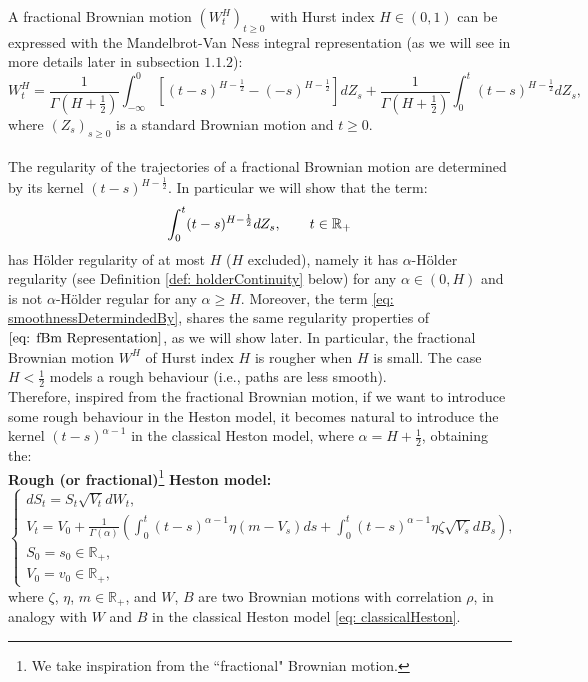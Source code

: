 \documentclass[a4paper,italian,11pt]{book}
\theoremstyle{plain}
\theoremstyle{remark}
\theoremstyle{plain}
\begin{document}
A fractional Brownian motion $(W_t^H)_{t\ge 0}$ with Hurst index $H\in (0,1)$ can be expressed with the Mandelbrot-Van Ness integral representation (as we will see in more details later in subsection $1.1.2$):
\begin{equation}
    \label{eq: fBm Representation}
    W_t^H = \frac{1}{\Gamma(H+\frac{1}{2})}\int_{-\infty}^0 [(t-s)^{H-\frac{1}{2}}-(-s)^{H-\frac{1}{2}}]dZ_s + \frac{1}{\Gamma(H+\frac{1}{2})} \int_0^t (t-s)^{H-\frac{1}{2}}dZ_s,
\end{equation}
where $(Z_s)_{s\ge 0}$ is a standard Brownian motion and $t\ge 0$.
\\
\\
The regularity of the trajectories of a fractional Brownian motion are determined by its kernel $(t-s)^{H-\frac{1}{2}}$. In particular we will show that the term:
\begin{equation}
    \label{eq: smoothnessDetermindedBy}
    \int_0^t (t-s)^{H-\frac{1}{2}} dZ_s,   \hspace{0.7cm} t\in \mathbb{R}_+
\end{equation}
has Hölder regularity of at most $H$ ($H$ excluded), 
namely it has $\alpha$-Hölder regularity (see Definition \ref{def: holderContinuity} below) for any $\alpha \in (0,H)$ and is not $\alpha$-Hölder regular for any $\alpha \ge H$. 
Moreover, the term \eqref{eq: smoothnessDetermindedBy}, shares the same regularity properties of $\eqref{eq: fBm Representation}$, as we will show later.
In particular, the fractional Brownian motion $W^H$ of Hurst index $H$ is rougher when $H$ is small. The case $H<\frac{1}{2}$ models a rough behaviour (i.e., paths are less smooth).
\\

Therefore, inspired from the fractional Brownian motion, if we want to introduce some rough behaviour in the Heston model, it becomes natural to introduce the kernel $(t-s)^{\alpha -1}$ in the classical Heston model, where $\alpha = H+\frac{1}{2}$, obtaining the:
\\
\textbf{Rough (or fractional)}\footnote{We take inspiration from the ``fractional" Brownian motion.} \textbf{Heston model:}
\begin{equation}
    \label{eq: fractionalHeston}
    \begin{cases} 
    dS_t = S_t\sqrt{V_t}dW_t, \\
    V_t = V_0 + \frac{1}{\Gamma(\alpha)} \left(\int_{0}^t (t-s)^{\alpha -1} \eta (m-V_s)ds + \int_0^t (t-s)^{\alpha -1} \eta \zeta \sqrt{V_s} dB_s\right),\\
    S_0 =s_0 \in \mathbb{R}_+, \\
    V_0 = v_0 \in \mathbb{R}_+,
    \end{cases}
\end{equation}
where $\zeta$, $\eta$, $m \in \mathbb{R}_+$, and $W$, $B$ are two Brownian motions with correlation $\rho$, in analogy with $W$ and $B$ in the classical Heston model \eqref{eq: classicalHeston}.
\end{document}
